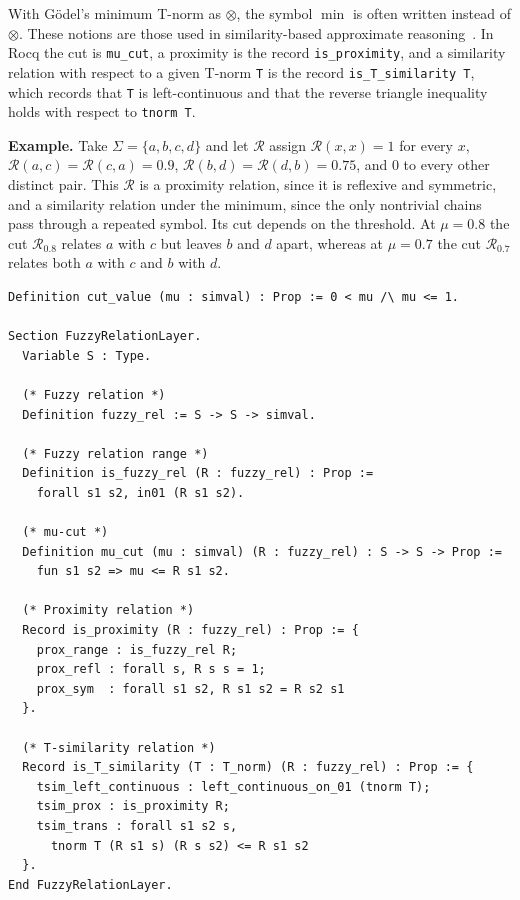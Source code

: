 With Gödel's minimum T-norm as $\otimes$, the symbol $\min$ is often written instead
of $\otimes$. These notions are those used in similarity-based approximate
reasoning~\cite{Sessa2002}. In Rocq the cut is \texttt{mu\_cut}, a proximity is the
record \texttt{is\_proximity}, and a similarity relation with respect to a given
T-norm \texttt{T} is the record \texttt{is\_T\_similarity T}, which records that
\texttt{T} is left-continuous and that the reverse triangle inequality holds with
respect to \texttt{tnorm T}.

\noindent\textbf{Example.} Take $\Sigma=\{a,b,c,d\}$ and let $\mathcal{R}$ assign
$\mathcal{R}(x,x)=1$ for every $x$, $\mathcal{R}(a,c)=\mathcal{R}(c,a)=0.9$,
$\mathcal{R}(b,d)=\mathcal{R}(d,b)=0.75$, and $0$ to every other distinct pair. This
$\mathcal{R}$ is a proximity relation, since it is reflexive and symmetric, and a
similarity relation under the minimum, since the only nontrivial chains pass through
a repeated symbol. Its cut depends on the threshold. At $\mu=0.8$ the cut
$\mathcal{R}_{0.8}$ relates $a$ with $c$ but leaves $b$ and $d$ apart, whereas at
$\mu=0.7$ the cut $\mathcal{R}_{0.7}$ relates both $a$ with $c$ and $b$ with $d$.

\begin{lstlisting}[style=rocqstyle,caption={Fuzzy relations, cut, proximity, and $T$-similarity (\texttt{SimilarityRelations.v}).},label={lst:fuzzyrel}]
Definition cut_value (mu : simval) : Prop := 0 < mu /\ mu <= 1.

Section FuzzyRelationLayer.
  Variable S : Type.

  (* Fuzzy relation *)
  Definition fuzzy_rel := S -> S -> simval.

  (* Fuzzy relation range *)
  Definition is_fuzzy_rel (R : fuzzy_rel) : Prop :=
    forall s1 s2, in01 (R s1 s2).

  (* mu-cut *)
  Definition mu_cut (mu : simval) (R : fuzzy_rel) : S -> S -> Prop :=
    fun s1 s2 => mu <= R s1 s2.

  (* Proximity relation *)
  Record is_proximity (R : fuzzy_rel) : Prop := {
    prox_range : is_fuzzy_rel R;
    prox_refl : forall s, R s s = 1;
    prox_sym  : forall s1 s2, R s1 s2 = R s2 s1
  }.

  (* T-similarity relation *)
  Record is_T_similarity (T : T_norm) (R : fuzzy_rel) : Prop := {
    tsim_left_continuous : left_continuous_on_01 (tnorm T);
    tsim_prox : is_proximity R;
    tsim_trans : forall s1 s2 s,
      tnorm T (R s1 s) (R s s2) <= R s1 s2
  }.
End FuzzyRelationLayer.
\end{lstlisting}

